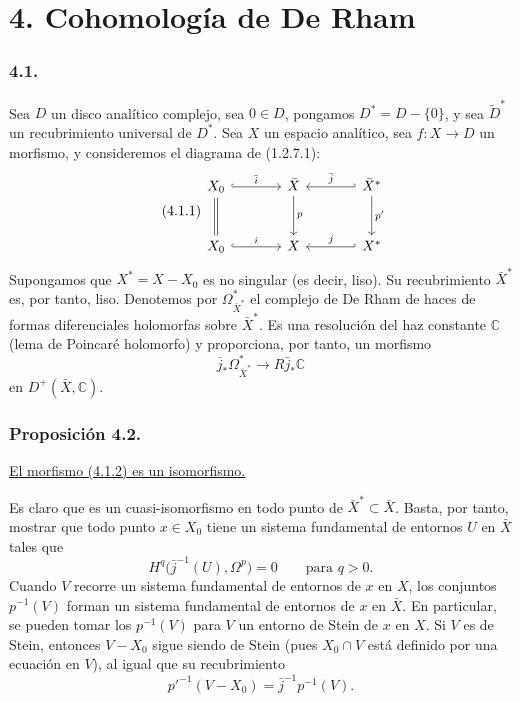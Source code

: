 \pageoriginale

\section*{4. Cohomología de De Rham}

\subsubsection*{4.1.}
Sea $D$ un disco analítico complejo, sea $0\in D$, pongamos
$D^*=D-\{0\}$, y sea $\widetilde D^*$ un recubrimiento universal de
$D^*$. Sea $X$ un espacio analítico, sea
$f:X\longrightarrow D$ un morfismo, y consideremos el diagrama de
(1.2.7.1):
\begin{equation}\tag{4.1.1}
\begin{tikzcd}[column sep=large,row sep=large]
X_0 \arrow[r,hook,"\bar i"] \arrow[d,equal]
  & \bar X \arrow[d,"p"]
  & \bar X^* \arrow[l,hook',"\bar j"'] \arrow[d,"p'"] \\
X_0 \arrow[r,hook,"i"]
  & X
  & X^* \arrow[l,hook',"j"']
\end{tikzcd}
\end{equation}
Supongamos que $X^*=X-X_0$ es no singular (es decir, liso). Su
recubrimiento $\bar X^*$ es, por tanto, liso. Denotemos por
$\Omega_{\bar X^*}^*$ el complejo de De Rham de haces de formas
diferenciales holomorfas sobre $\bar X^*$. Es una resolución del haz
constante $\mathbb C$ (lema de Poincaré holomorfo) y proporciona, por
tanto, un morfismo
\begin{equation}\tag{4.1.2}
\bar j_*\Omega_{\bar X^*}^*
\longrightarrow R\bar j_*\mathbb C
\end{equation}
en $D^+(\bar X,\mathbb C)$.

\subsubsection*{Proposición 4.2.}
\underline{El morfismo (4.1.2) es un isomorfismo.}

Es claro que  es un cuasi-isomorfismo en todo
punto de $\bar X^*\subset\bar X$. Basta, por tanto, mostrar que todo
punto $x\in X_0$ tiene un sistema fundamental de entornos $U$ en
$\bar X$ tales que
\[
H^q\bigl(\bar j^{-1}(U),\Omega^p\bigr)=0
\qquad\text{para }q>0.
\]
Cuando $V$ recorre un sistema fundamental de entornos de $x$ en $X$,
los conjuntos $p^{-1}(V)$ forman un sistema fundamental de entornos de
$x$ en $\bar X$. En particular, se pueden tomar los $p^{-1}(V)$ para
$V$ un entorno de Stein de $x$ en $X$. Si $V$ es de Stein, entonces
$V-X_0$ sigue siendo de Stein (pues $X_0\cap V$ está definido por una
ecuación en $V$), al igual que su recubrimiento
\[
p'^{-1}(V-X_0)=\bar j^{-1}p^{-1}(V).
\]

